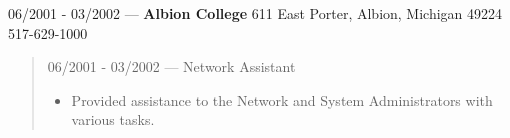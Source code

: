 06/2001 - 03/2002 --- {\bf Albion College} 611 East Porter, Albion, Michigan 49224 517-629-1000
\begin{quote}
06/2001 - 03/2002 --- Network Assistant
\begin{itemize}
\item Provided assistance to the Network and System Administrators with various
tasks.
\end{itemize}
\end{quote}
